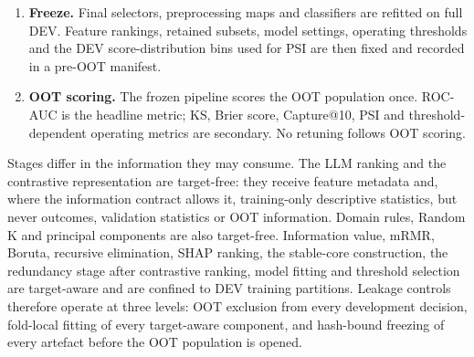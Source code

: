 \documentclass[preprint,12pt]{elsarticle}
\begin{document}
\begin{enumerate}
    \item \textbf{Freeze.} Final selectors, preprocessing maps and classifiers are refitted on full DEV. Feature rankings, retained subsets, model settings, operating thresholds and the DEV score-distribution bins used for PSI are then fixed and recorded in a pre-OOT manifest.
    \item \textbf{OOT scoring.} The frozen pipeline scores the OOT population once. ROC-AUC is the headline metric; KS, Brier score, Capture@10, PSI and threshold-dependent operating metrics are secondary. No retuning follows OOT scoring.
\end{enumerate}

Stages differ in the information they may consume. The LLM ranking and the contrastive representation are target-free: they receive feature metadata and, where the information contract allows it, training-only descriptive statistics, but never outcomes, validation statistics or OOT information. Domain rules, Random K and principal components are also target-free. Information value, mRMR, Boruta, recursive elimination, SHAP ranking, the stable-core construction, the redundancy stage after contrastive ranking, model fitting and threshold selection are target-aware and are confined to DEV training partitions. Leakage controls therefore operate at three levels: OOT exclusion from every development decision, fold-local fitting of every target-aware component, and hash-bound freezing of every artefact before the OOT population is opened.
\end{document}
